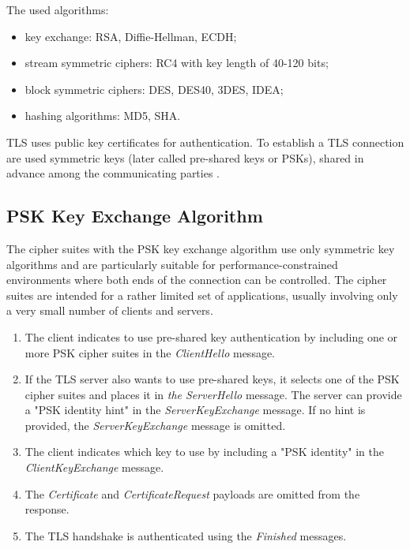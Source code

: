 \documentclass[
  digital, %
  notable,   %
  lof,     %
  lot,     %
]{fithesis3}
\begin{document}

 
The used algorithms:
\begin{itemize}[leftmargin=2em,rightmargin=1em,itemsep=0.75\parskip,parsep=0em,topsep=0em,partopsep=0em]
\item key exchange: RSA, Diffie-Hellman, ECDH;
\item stream symmetric ciphers: RC4 with key length of 40-120 bits;
\item block symmetric ciphers: DES, DES40, 3DES, IDEA;
\item hashing algorithms: MD5, SHA.
\end{itemize}
\vskip0.1in
TLS uses public key certificates for authentication. To establish a TLS connection are used 
symmetric keys (later called pre-shared keys or PSKs), shared in advance among the 
communicating parties \cite{eronen2005pre}.

\subsection{PSK Key Exchange Algorithm}\label{pskAlgorithm}
The cipher suites with the PSK key exchange algorithm use only symmetric key algorithms and 
are particularly suitable for performance-constrained environments where both ends of the 
connection can be controlled. The cipher suites are intended for a rather limited set of 
applications, usually involving only a very small number of clients and servers.

\begin{enumerate}
\item The client indicates to use pre-shared key authentication by including one or more PSK cipher suites in the \textit{ClientHello} message. 
\item If the TLS server also wants to use pre-shared keys, it selects one of the PSK cipher suites and places it in \textit{the ServerHello} message. The server can provide a "PSK identity hint" in the \textit{ServerKeyExchange} message. If no hint is provided, the \textit{ServerKeyExchange} message is omitted.
\item The client indicates which key to use by including a "PSK identity" in the \textit{ClientKeyExchange} message.
\item The \textit{Certificate} and \textit{CertificateRequest} payloads are omitted from the response.
\item The TLS handshake is authenticated using the \textit{Finished} messages. 
\end{enumerate}
\end{document}
